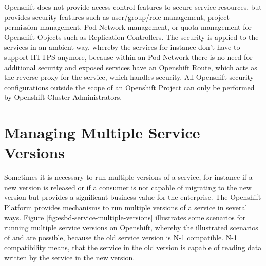 Openshift does not provide access control features to secure service resources, but provides security features such as user/group/role management, project permission management, Pod Network management, or quota management for Openshift Objects such as Replication Controllers. The security is applied to the services in an ambient way, whereby the services for instance don't have to support HTTPS anymore, because within an Pod Network there is no need for additional security and exposed services have an Openshift Route, which acts as the reverse proxy for the service, which handles security. All Openshift security configurations outside the scope of an Openshift Project can only be performed by Openshift Cluster-Administrators. 

\section{Managing Multiple Service Versions}
\label{sec:esbd-multi-version-service}
Sometimes it is necessary to run multiple versions of a service, for instance if a new version is released or if a consumer is not capable of migrating to the new version but provides a significant business value for the enterprise. The Openshift Platform provides mechanisms to run multiple versions of a service in several ways. Figure \vref{fig:esbd-service-multiple-versions} illustrates some scenarios for running multiple service versions on Openshift, whereby the illustrated scenarios of  and  are possible, because the old service version is N-1 compatible. N-1 compatibility means, that the service in the old version is capable of reading data written by the service in the new version.
\newpage

